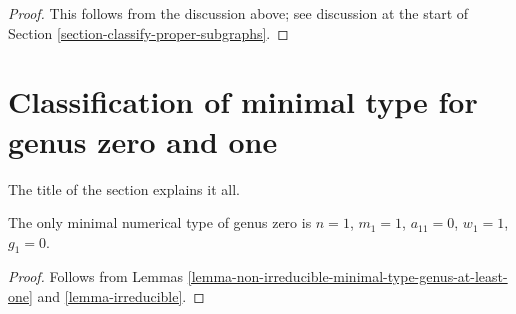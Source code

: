 \begin{proof}
This follows from the discussion above; see discussion at the
start of Section \ref{section-classify-proper-subgraphs}.
\end{proof}













\section{Classification of minimal type for genus zero and one}
\label{section-classification-genus-one}

\noindent
The title of the section explains it all.

\begin{lemma}
\label{lemma-genus-zero}
The only minimal numerical type of genus zero is
$n = 1$, $m_1 = 1$, $a_{11} = 0$, $w_1 = 1$, $g_1 = 0$.
\end{lemma}

\begin{proof}
Follows from Lemmas \ref{lemma-non-irreducible-minimal-type-genus-at-least-one}
and \ref{lemma-irreducible}.
\end{proof}

